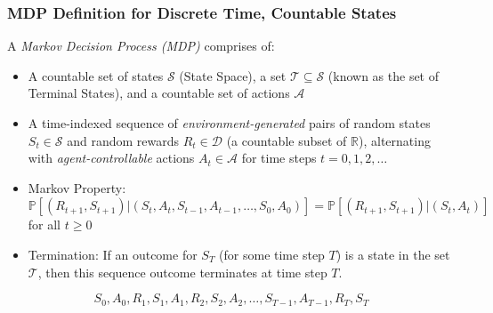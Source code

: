 \documentclass[handout]{beamer}
\begin{document}
\begin{frame}
\frametitle{MDP Definition for Discrete Time, Countable States}
\pause
\begin{definition}
A {\em Markov Decision Process (MDP)} comprises of:

\begin{itemize}

\item A countable set of states $\mathcal{S}$ (State Space), a set $\mathcal{T} \subseteq \mathcal{S}$ (known as the set of Terminal States), and a countable set of actions $\mathcal{A}$

\item A time-indexed sequence of {\em environment-generated} pairs of random states $S_t \in \mathcal{S}$ and random rewards $R_t \in \mathcal{D}$ (a countable subset of $\mathbb{R}$), alternating with {\em agent-controllable} actions $A_t \in \mathcal{A}$ for time steps $t=0, 1, 2, \ldots$

\item Markov Property: $\mathbb{P}[(R_{t+1}, S_{t+1}) | (S_t, A_t, S_{t-1}, A_{t-1}, \ldots, S_0, A_0)] = \mathbb{P}[(R_{t+1}, S_{t+1}) | (S_t, A_t)]$ for all $t \geq 0$

\item Termination: If an outcome for $S_T$ (for some time step $T$) is a state in the set $\mathcal{T}$, then this sequence outcome terminates at time step $T$.

\end{itemize}

\end{definition}
 \pause
  $$S_0, A_0, R_1, S_1, A_1, R_2, S_2, A_2, \ldots, S_{T-1}, A_{T-1}, R_T, S_T$$
\end{frame}
\end{document}
